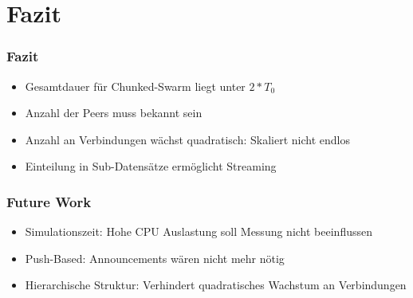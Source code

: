 \section{Fazit}


\begin{frame}
  \frametitle{Fazit}
  \begin{itemize}  
    \item Gesamtdauer für Chunked-Swarm liegt unter $2*T_0$
    \vspace{1mm}
    \item Anzahl der Peers muss bekannt sein
    \vspace{1mm}
    \item Anzahl an Verbindungen wächst quadratisch: Skaliert nicht endlos
    \vspace{1mm}
    \item Einteilung in Sub-Datensätze ermöglicht Streaming
  \end{itemize}		
\end{frame}


\begin{frame}
  \frametitle{Future Work}
  \begin{itemize}
	  \item Simulationszeit: Hohe CPU Auslastung soll Messung nicht beeinflussen
	  \vspace{1mm}
	  \item Push-Based: Announcements wären nicht mehr nötig
	  \vspace{1mm}
	  \item Hierarchische Struktur: Verhindert quadratisches Wachstum an Verbindungen
  \end{itemize}		
\end{frame}